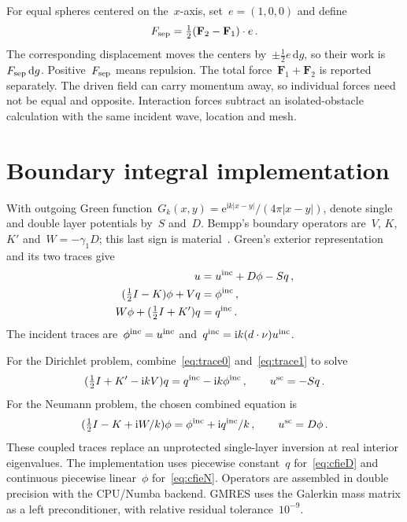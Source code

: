 \documentclass[11pt,a4paper]{article}
\numberwithin{equation}{section}
\newcommand{\dd}{\,\mathrm d}
\newcommand{\ii}{\mathrm i}
\begin{document}
For equal spheres centered on the~$x$-axis, set~$e=(1,0,0)$ and define
\begin{equation}\label{eq:separation}
 F_{\rm sep}=\tfrac12(\mathbf F_2-\mathbf F_1)\cdot e\,.
\end{equation}
The corresponding displacement moves the centers by~$\pm\tfrac12 e\dd g$, so their work is~$F_{\rm sep}\dd g$. Positive~$F_{\rm sep}$ means repulsion. The total force~$\mathbf F_1+\mathbf F_2$ is reported separately. The driven field can carry momentum away, so individual forces need not be equal and opposite. Interaction forces subtract an isolated-obstacle calculation with the same incident wave, location and mesh.

\section{Boundary integral implementation}
With outgoing Green function~$G_k(x,y)=\mathrm e^{\ii k|x-y|}/(4\pi|x-y|)$, denote single and double layer potentials by~$S$ and~$D$. Bempp's boundary operators are~$V$, $K$, $K'$ and~$W=-\gamma_1D$; this last sign is material~\cite{bempp-operators}. Green's exterior representation and its two traces give
\begin{align}
 u&=u^{\rm inc}+D\phi-Sq\,,\\
 (\tfrac12 I-K)\phi+Vq&=\phi^{\rm inc}\,,\label{eq:trace0}\\
 W\phi+(\tfrac12 I+K')q&=q^{\rm inc}\,.\label{eq:trace1}
\end{align}
The incident traces are~$\phi^{\rm inc}=u^{\rm inc}$ and~$q^{\rm inc}=\ii k(d\cdot\nu)u^{\rm inc}$.

For the Dirichlet problem, combine~\eqref{eq:trace0} and~\eqref{eq:trace1} to solve
\begin{equation}\label{eq:cfieD}
 (\tfrac12I+K'-\ii kV)q=q^{\rm inc}-\ii k\phi^{\rm inc}\,,
 \qquad u^{\rm sc}=-Sq\,.
\end{equation}
For the Neumann problem, the chosen combined equation is
\begin{equation}\label{eq:cfieN}
 (\tfrac12I-K+\ii W/k)\phi=\phi^{\rm inc}+\ii q^{\rm inc}/k\,,
 \qquad u^{\rm sc}=D\phi\,.
\end{equation}
These coupled traces replace an unprotected single-layer inversion at real interior eigenvalues. The implementation uses piecewise constant~$q$ for~\eqref{eq:cfieD} and continuous piecewise linear~$\phi$ for~\eqref{eq:cfieN}. Operators are assembled in double precision with the CPU/Numba backend. GMRES uses the Galerkin mass matrix as a left preconditioner, with relative residual tolerance~$10^{-9}$.
\end{document}
